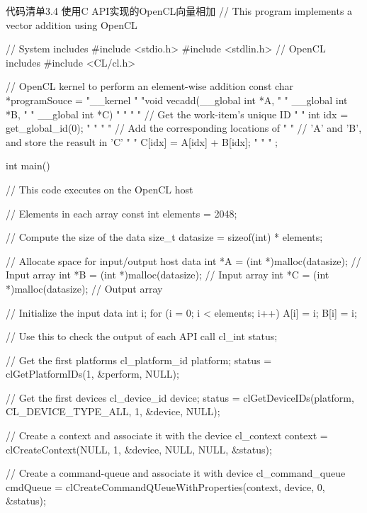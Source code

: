 \begin{codeboxt}[cpp]{代码清单3.4 使用C API实现的OpenCL向量相加}
// This program implements a vector addition using OpenCL

// System includes
#include <stdio.h>
#include <stdlin.h>
// OpenCL includes
#include <CL/cl.h>

// OpenCL kernel to perform an element-wise addition
const char *programSouce =
"__kernel                                         \n"
"void vecadd(__global int *A,                     \n"
"            __global int *B,                     \n"
"            __global int *C)                     \n"
"{                                                \n"
"  // Get the work-item's unique ID               \n"
"  int idx = get_global_id(0);                    \n"
"                                                 \n"
"  // Add the corresponding locations of          \n"
"  // 'A' and 'B', and store the reasult in 'C'   \n"
"  C[idx] = A[idx] + B[idx];                      \n"
"}                                                \n"
;

int main(){
  // This code executes on the OpenCL host

  // Elements in each array
  const int elements = 2048;

  // Compute the size of the data
  size_t datasize = sizeof(int) * elements;

  // Allocate space for input/output host data
  int *A = (int *)malloc(datasize); // Input array
  int *B = (int *)malloc(datasize); // Input array
  int *C = (int *)malloc(datasize); // Output array

  // Initialize the input data
  int i;
  for (i = 0; i < elements; i++){
    A[i] = i;
    B[i] = i;
  }

  // Use this to check the output of each API call
  cl_int status;

  // Get the first platforms
  cl_platform_id platform;
  status = clGetPlatformIDs(1, &perform, NULL);

  // Get the first devices
  cl_device_id device;
  status = clGetDeviceIDs(platform, CL_DEVICE_TYPE_ALL, 1, &device, NULL);

  // Create a context and associate it with the device
  cl_context context = clCreateContext(NULL, 1, &device, NULL, NULL, &status);

  // Create a command-queue and associate it with device
  cl_command_queue cmdQueue = clCreateCommandQUeueWithProperties(context, device, 0, &status);

}
\end{codeboxt}
